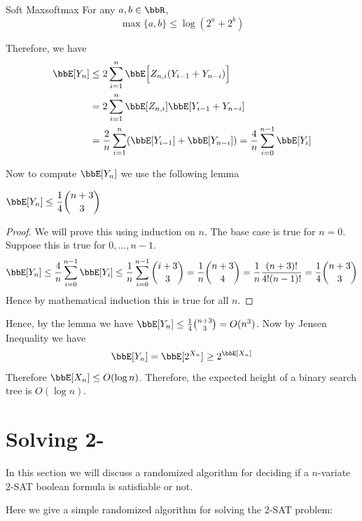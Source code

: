 \begin{lemma}{Soft Max}{softmax}
	For any $a,b\in \bbR$, $$\max\{a,b\}\leq \log (2^a+2^b)$$
\end{lemma}


Therefore, we have \begin{align*}
	\bbE[Y_n] & \leq 2\sum\limits_{i=1}^n\bbE\Big[Z_{n,i}(Y_{i-1}+ Y_{n-i})\Big]\\
	& = 2\sum\limits_{i=1}^n\bbE[Z_{n,i}]\bbE[Y_{i-1}+ Y_{n-i}]\\
	& = \frac2n\sum_{i=1}^n (\bbE[Y_{i-1}]+\bbE[Y_{n-i}])=\frac4n\sum_{i=0}^{n-1}\bbE[Y_i]
\end{align*}

Now to compute $\bbE[Y_n]$ we use the following lemma
\begin{lemma}{}{}
	$\dps{\bbE[Y_n]\leq\frac14\binom{n+3}{3}}$
\end{lemma}
\begin{proof}
	We will prove this using induction on $n$. The base case is true for $n=0$. Suppose this is true for $0,\dots, n-1$. $$	\bbE[Y_n]\leq \frac4n\sum_{i=0}^{n-1}\bbE[Y_i]\leq \frac1n\sum_{i=0}^{n-1}\binom{i+3}{3}= \frac1n\binom{n+3}{4}= \frac1n\frac{(n+3)!}{4!(n-1)!}= \frac14\binom{n+3}{3}$$Hence by  mathematical induction  this is true for all $n$. 
\end{proof}

Hence, by the lemma we have $\bbE[Y_n]\leq\frac14\binom{n+3}{3}=O(n^3)$. Now by Jensen Inequality we have $$\bbE[Y_n]=\bbE[2^{X_n}]\geq 2^{\bbE[X_n]}$$Therefore $\bbE[X_n]\leq O(\log n)$. Therefore, the expected height of a binary search tree is $O(\log n)$. 
\section{Solving 2-}
In this section we will discuss a randomized algorithm for deciding if a $n$-variate 2-SAT boolean formula is satisfiable or not.

\begin{algoprob}
\end{algoprob}\parinf

Here we give a simple randomized algorithm for solving the 2-SAT problem:\parinn\newpage

\begin{algorithm}
\DontPrintSemicolon
{}
\caption{2-SAT Randomized Algorithm}
\end{algorithm}

